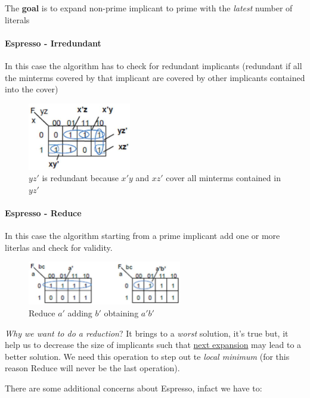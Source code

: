 The \textbf{goal} is to expand non-prime implicant to prime with the \textit{latest} number of literals

\paragraph{Espresso - Irredundant} In this case the algorithm has to check for redundant implicants (redundant if all the minterms covered by that implicant are covered by other implicants contained into the cover)
\begin{figure}[H]
	\centering
	\includegraphics[width=0.4\textwidth]{./Cap6/Images/Image10.png}
	\caption{$yz'$ is redundant because $x'y$ and $xz'$ cover all minterms contained in $yz'$}
	\label{fig:checkredundant}
\end{figure}

\paragraph{Espresso - Reduce} In this case the algorithm starting from a prime implicant add one or more literlas and check for validity.
\begin{figure}[H]
	\centering
	\includegraphics[width=0.6\textwidth]{./Cap6/Images/Image11.png}
	\caption{Reduce $a'$ adding $b'$ obtaining $a'b'$}
	\label{fig:reduceespresso}
\end{figure}

\textit{Why we want to do a reduction}? It brings to a \textit{worst} solution, it's true but, it help us to decrease the size of implicants such that \underline{next expansion} may lead to a better solution. We need this operation to step out te \textit{local minimum} (for this reason Reduce will never be the last operation).

\bigskip 

There are some additional concerns about Espresso, infact we have to:

